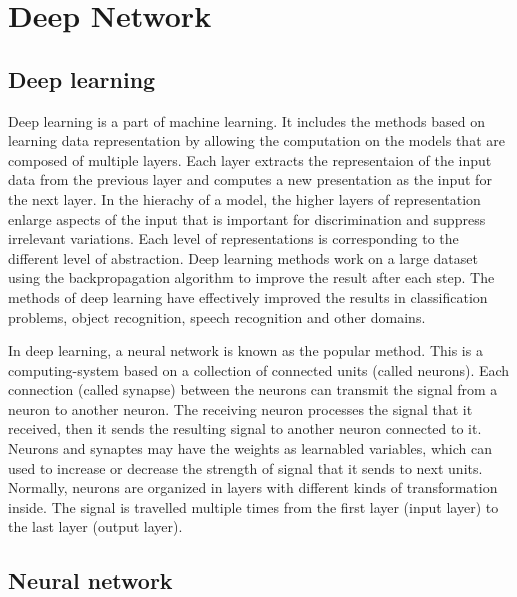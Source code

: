 \chapter{Deep Network}
\section{Deep learning}
Deep learning is a part of machine learning. It includes the methods based on learning data representation by allowing the computation on the models that are composed of multiple layers. Each layer extracts the representaion of the input data from the previous layer and computes a new presentation as the input for the next layer. In the hierachy of a model, the higher layers of representation enlarge aspects of the input that is important for discrimination and suppress irrelevant variations. Each level of representations is corresponding to the different level of abstraction. Deep learning methods work on a large dataset using the backpropagation algorithm to improve the result after each step. The methods of deep learning have effectively improved the results in classification problems, object recognition, speech recognition and other domains. 

In deep learning, a neural network is known as the popular method. This is a computing-system based on a collection of connected units (called neurons). Each connection (called synapse) between the neurons can transmit the signal from a neuron to another neuron. The receiving neuron processes the signal that it received, then it sends the resulting signal to another neuron connected to it. Neurons and synaptes may have the weights as learnabled variables, which can used to increase or decrease the strength of signal that it sends to next units. Normally, neurons are organized in layers with different kinds of transformation inside. The signal is travelled multiple times from the first layer (input layer) to the last layer (output layer).

\section{Neural network}
